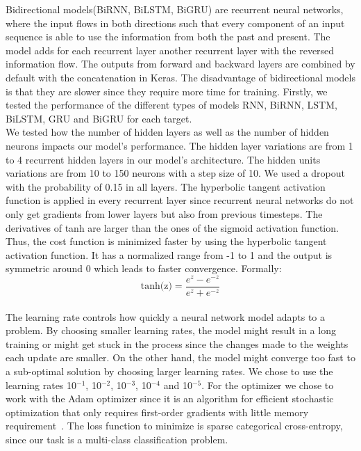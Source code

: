 \documentclass[11pt,oneside,a4paper,openright]{book}
\begin{document}
Bidirectional models(BiRNN, BiLSTM, BiGRU) are recurrent neural networks, where the input flows in both directions such that every component of an input sequence is able to use the information from both the past and present. The model adds for each recurrent layer another recurrent layer with the reversed information flow. The outputs from forward and backward layers are combined by default with the concatenation in Keras. The disadvantage of bidirectional models is that they are slower since they require more time for training. Firstly, we tested the performance of the different types of models RNN, BiRNN, LSTM, BiLSTM, GRU and BiGRU for each target.\\

We tested how the number of hidden layers as well as the number of hidden neurons impacts our model's performance. The hidden layer variations are from 1 to 4 recurrent hidden layers in our model's architecture. The hidden units variations are from 10 to 150 neurons with a step size of 10. We used a dropout with the probability of 0.15 in all layers. The hyperbolic tangent activation function is applied in every recurrent layer since recurrent neural networks do not only get gradients from lower layers but also from previous timesteps. The derivatives of tanh are larger than the ones of the sigmoid activation function. Thus, the cost function is minimized faster by using the hyperbolic tangent activation function. It has a normalized range from -1 to 1 and the output is symmetric around 0 which leads to faster convergence. Formally:
\begin{equation}\label{eq:tanh}
  \text{tanh(z)} = \frac{e^{z} - e^{-z} }{e^{z} + e^{-z} }
\end{equation}\\

The learning rate controls how quickly a neural network model adapts to a problem. By choosing smaller learning rates, the model might result in a long training or might get stuck in the process since the changes made to the weights each update are smaller. On the other hand, the model might converge too fast to a sub-optimal solution by choosing larger learning rates. We chose to use the learning rates 10$^{-1}$, 10$^{-2}$, 10$^{-3}$, 10$^{-4}$ and 10$^{-5}$. For the optimizer we chose to work with the Adam optimizer since it is an algorithm for efficient stochastic optimization that only requires first-order gradients with little memory requirement~\cite{Adam}. The loss function to minimize is sparse categorical cross-entropy, since our task is a multi-class classification problem.\\
\end{document}
